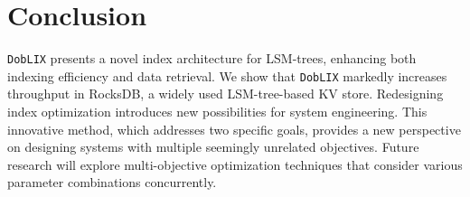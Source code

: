 


\section{Conclusion}
\label{sec:conclusion}
\texttt{DobLIX} presents a novel index architecture for LSM-trees, enhancing both indexing efficiency and data retrieval. We show that \texttt{DobLIX} markedly increases throughput in RocksDB, a widely used LSM-tree-based KV store. Redesigning index optimization introduces new possibilities for system engineering. This innovative method, which addresses two specific goals, provides a new perspective on designing systems with multiple seemingly unrelated objectives. Future research will explore multi-objective optimization techniques that consider various parameter combinations concurrently.